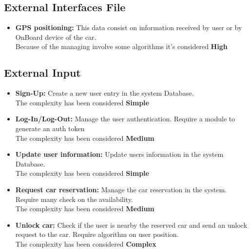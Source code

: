 \subsection{External Interfaces File} 

\begin{itemize}
	\item \textbf{GPS positioning:} This data consist on information received by user or by OnBoard device of the car. \\Because of the managing involve some algorithms it's considered \textbf{High}
\end{itemize}


\subsection{External Input} 
\begin{itemize}
	\item \textbf{Sign-Up:} Create a new user entry in the system Database. \\The complexity has been considered \textbf{Simple}
	\item \textbf{Log-In/Log-Out:} Manage the user authentication. Require a module to generate an auth token\\The complexity has been considered \textbf{Medium}
	\item \textbf{Update user information:} Update users information in the system Database. \\The complexity has been considered \textbf{Simple}
	\item \textbf{Request car reservation:} Manage the car reservation in the system. Require many check on the availability.  \\The complexity has been considered \textbf{Medium}
	\item \textbf{Unlock car:} Check if the user is nearby the reserved car and send an unlock request to the car. Require algorithm on user position.  \\The complexity has been considered \textbf{Complex}
\end{itemize}


